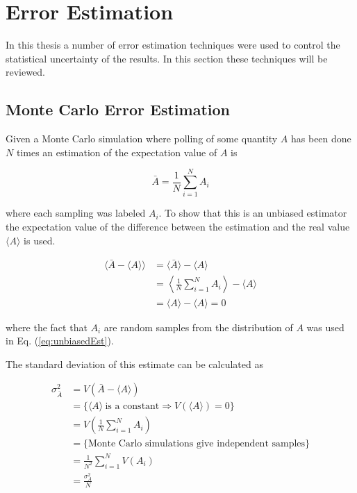 \newpage


\section{Error Estimation}
\label{sec:ErrorEst}

In this thesis a number of error estimation techniques were used to control the statistical uncertainty of the results. In this section these techniques will be reviewed.

\subsection{Monte Carlo Error Estimation}
\label{subsec:MonteCarloErrorEst}

Given a Monte Carlo simulation where polling of some quantity $A$ has been done $N$ times an estimation of the expectation value of $A$ is

\begin{equation}
    \bar A = \frac{1}{N} \sum_{i = 1}^{N} A_i
\end{equation}

\noindent where each sampling was labeled $A_i$. To show that this is an unbiased estimator the expectation value of the difference between the estimation and the real value $\langle A \rangle$ is used.

\begin{align}
    \langle \bar A - \langle A \rangle \rangle &= \langle \bar A \rangle - \langle A \rangle \\
%
    &= \left \langle \frac{1}{N} \sum_{i = 1}^{N} A_i \right \rangle - \langle A \rangle \\
%
    &= \langle A \rangle - \langle A \rangle = 0
    \label{eq:unbiasedEst}
\end{align}

\noindent where the fact that $A_i$ are random samples from the distribution of $A$ was used in Eq. (\ref{eq:unbiasedEst}).

The standard deviation of this estimate can be calculated as

\begin{align}
    \sigma_{\bar A}^{2} &= V\left( \bar A - \langle A \rangle \right ) \\
%
    &= \{ \langle A \rangle \ \text{is a constant} \Rightarrow V(\langle A \rangle) = 0 \} \\
%
    &= V \left ( \frac{1}{N} \sum_{i = 1}^{N} A_i \right ) \\
%
    &= \{ \text{Monte Carlo simulations give independent samples} \} \\
%
    &= \frac{1}{N^2} \sum_{i = 1}^{N} V(A_i) \\
%
    &= \frac{\sigma_{A}^2}{N}
\end{align}

